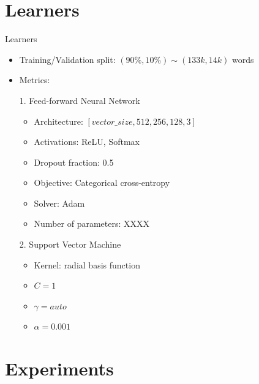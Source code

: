 \documentclass[11pt]{beamer}
\begin{document}
\section{Learners}
\begin{frame}{Learners}
\begin{itemize}
\item Training/Validation split: $(90\%,10\%) \sim (133k, 14k)$ words 
\item Metrics:
\item[1.] Feed-forward Neural Network
\begin{itemize}
\item Architecture: $[vector\_size, 512, 256, 128, 3]$
\item Activations: ReLU, Softmax
\item Dropout fraction: 0.5
\item Objective: Categorical cross-entropy
\item Solver: Adam
\item Number of parameters: XXXX
\end{itemize}
\item[2.] Support Vector Machine
\begin{itemize}
\item Kernel: radial basis function
\item $C=1$
\item $\gamma = auto$
\item $\alpha = 0.001$
\end{itemize}
\end{itemize}
\end{frame}

\section{Experiments}
\end{document}
